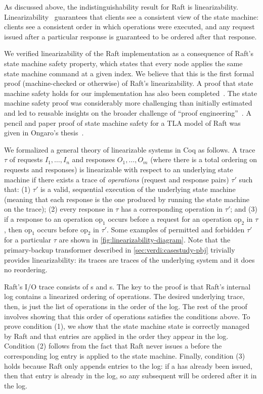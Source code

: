As discussed above, the indistinguishability result for Raft is
linearizability. Linearizability~\cite{herlihy:linearizability}
guarantees that clients see a consistent view of the state machine:
clients see a consistent order in which operations were executed, and
any request issued after a particular response is guaranteed to be
ordered after that response.

We verified linearizability of the \Verdi Raft implementation as a
consequence of Raft's state machine safety property, which
states that every node applies the same state machine command at a
given index. We believe that this is the first formal proof
(machine-checked or otherwise) of Raft's linearizability. A proof that
state machine safety holds for our implementation
has also been completed~\cite{verdi-repo}.
The state machine safety proof was considerably more challenging
than initially estimated and led to reusable insights on the
broader challenge of ``proof engineering''~\cite{Woos-al:CPP16}.
A pencil and paper proof of state machine
safety for a TLA model of Raft was given in Ongaro's
thesis~.

We formalized a general theory of linearizable systems in Coq as
follows. A trace $\tau$ of requests $I_1,\dots,I_n$ and responses
$O_1,\dots,O_m$ (where there is a total ordering on requests and
responses) is linearizable with respect to an underlying state machine
if there exists a trace of \textit{operations} (\ie request and
response pairs) $\tau'$ such that: (1) $\tau'$ is a valid, sequential
execution of the underlying state machine (meaning that each response
is the one produced by running the state machine on the trace); (2)
every response in $\tau$ has a corresponding operation in $\tau'$; and
(3) if a response to an operation $\mathrm{op}_1$ occurs before a
request for an operation $\mathrm{op}_2$ in $\tau$, then
$\mathrm{op}_1$ occurs before $\mathrm{op}_2$ in $\tau'$. Some
examples of permitted and forbidden $\tau'$ for a particular $\tau$
are shown in \cref{fig:linearizability-diagram}. Note that the
primary-backup transformer described in \cref{sec:verdi:casestudy-pbj}
trivially provides linearizability: its traces are traces of the
underlying system and it does no reordering.

Raft's I/O trace consists of s and
s. The key to the proof is that Raft's internal
log contains a linearized ordering of operations. The desired
underlying trace, then, is just the list of operations in the order of
the log. The rest of the proof involves showing that this order of
operations satisfies the conditions above. To prove condition (1), we
show that the state machine state is correctly managed by Raft and
that entries are applied in the order they appear in the
log. Condition (2) follows from the fact that Raft never issues a
 before the corresponding log entry is applied to
the state machine. Finally, condition (3) holds because Raft only
appends entries to the log: if a  has already
been issued, then that entry is already in the log, so any subsequent
 will be ordered after it in the log.


